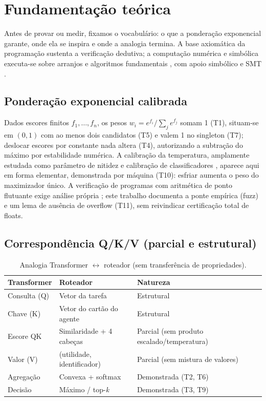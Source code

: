 \chapter{Fundamentação teórica}
Antes de provar ou medir, fixamos o vocabulário: o que a ponderação exponencial garante, onde ela se inspira e onde a analogia termina. A base axiomática da programação \cite{hoare1969} sustenta a verificação dedutiva; a computação numérica e simbólica executa-se sobre arranjos e algoritmos fundamentais \cite{harris2020,virtanen2020}, com apoio simbólico e SMT \cite{meurer2017,demoura2008}.
\section{Ponderação exponencial calibrada}
Dados escores finitos $f_1,\dots,f_n$, os pesos $w_i=e^{f_i}/\sum_j e^{f_j}$ somam 1 (T1), situam-se em $(0,1)$ com ao menos dois candidatos (T5) e valem 1 no singleton (T7); deslocar escores por constante nada altera (T4), autorizando a subtração do máximo por estabilidade numérica. A calibração da temperatura, amplamente estudada como parâmetro de nitidez e calibração de classificadores \cite{komisarenko2024,xuan2025,xie2024}, aparece aqui em forma elementar, demonstrada por máquina (T10): esfriar aumenta o peso do maximizador único. A verificação de programas com aritmética de ponto flutuante exige análise própria \cite{bagnara2019,murray2026}; este trabalho documenta a ponte empírica (fuzz) e um lema de ausência de overflow (T11), sem reivindicar certificação total de floats.
\section{Correspondência Q/K/V (parcial e estrutural)}
\begin{table}[h]
\centering
\caption{Analogia Transformer $\leftrightarrow$ roteador (sem transferência de propriedades).}
\label{tab:qkv}
\begin{tabular}{lll}
\toprule
Transformer & Roteador & Natureza \\
\midrule
Consulta (Q) & Vetor da tarefa & Estrutural \\
Chave (K) & Vetor do cartão do agente & Estrutural \\
Escore QK & Similaridade + 4 cabeças & Parcial (sem produto escalado/temperatura) \\
Valor (V) & (utilidade, identificador) & Parcial (sem mistura de valores) \\
Agregação & Convexa + softmax & Demonstrada (T2, T6) \\
Decisão & Máximo / top-\textit{k} & Demonstrada (T3, T9) \\
\bottomrule
\end{tabular}
\end{table}
